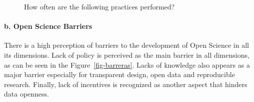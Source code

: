 \documentclass[
  letterpaper,
  DIV=11,
  numbers=noendperiod]{scrartcl}
\let\oldparagraph\paragraph
\renewcommand{\paragraph}[1]{\oldparagraph{#1}\mbox{}}
\begin{document}
\begin{figure}
\begin{minipage}[t]{\linewidth}
{{}

}

\end{minipage}%
\newline
\begin{minipage}[t]{\linewidth}

{\centering 


}

\end{minipage}%

\caption{\label{fig-prac-grid}How often are the following practices
performed?}

\end{figure}

\hypertarget{b.-open-science-barriers}{%
\paragraph{b. Open Science Barriers}\label{b.-open-science-barriers}}

There is a high perception of barriers to the development of Open
Science in all its dimensions. Lack of policy is perceived as the main
barrier in all dimensions, as can be seen in the
Figure~\ref{fig-barreras}. Lacks of knowledge also appears as a major
barrier especially for transparent design, open data and reproducible
research. Finally, lack of incentives is recognized as another aspect
that hinders data openness.
\end{document}
